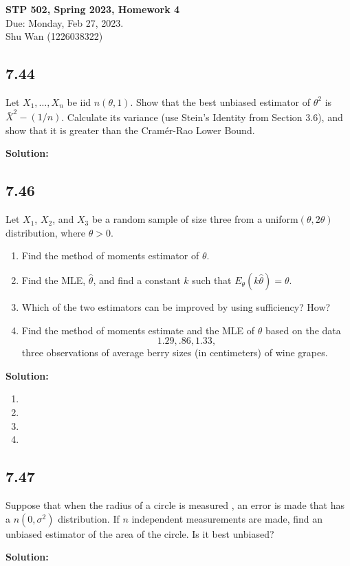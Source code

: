 \documentclass[11pt]{article}
\newcommand{\Sol}{\par {\bf Solution:}}
\newcommand{\sample}[1]{#1_1 , \dots , #1_n}
\begin{document}
\begin{center}
\Large{
\textbf{STP 502, Spring 2023, Homework 4} \\
Due: Monday, Feb 27, 2023. \\
Shu Wan (1226038322)
}
\end{center}
\subsection*{7.44}
Let $\sample{X}$ be iid $n(\theta, 1)$. Show that the best unbiased estimator of $\theta^2$ is $\bar X^2 - (1/ n)$.
Calculate its variance (use Stein's Identity from Section 3.6), and show that it is greater than the Cram\'{e}r-Rao Lower Bound.

\Sol

\subsection*{7.46}
Let $X_1$, $X_2$, and $X_3$ be a random sample of size three from a uniform$(\theta, 2\theta)$ distribution, where $\theta > 0$.
\begin{enumerate}[label=(\alph*)]
    \item Find the method of moments estimator of $\theta$.
    \item Find the MLE, $\hat \theta$, and find a constant $k$ such that $E_\theta(k\hat \theta) = \theta$.
    \item Which of the two estimators can be improved by using sufficiency? How?
    \item Find the method of moments estimate and the MLE of $\theta$ based on the data
    \[
    1.29, .86, 1.33,
    \]
    three observations of average berry sizes (in centimeters) of wine grapes.
\end{enumerate}

\Sol
\begin{enumerate}[label=(\alph*)]
    \item
    \item
    \item
    \item
\end{enumerate}

\subsection*{7.47}
Suppose that when the radius of a circle is measured , an error is made that has a $n(0, \sigma^2)$ distribution. If $n$ independent measurements are made, find an unbiased estimator of the area of the circle. Is it best unbiased?
\Sol
\end{document}
